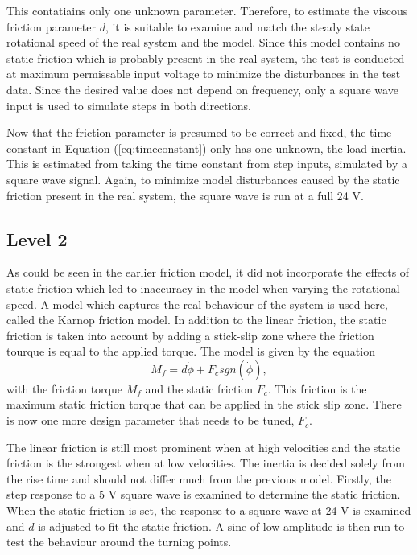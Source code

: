 \documentclass[12pt,a4paper]{article}
\begin{document}
This contatiains only one unknown parameter. Therefore, to estimate the viscous
friction parameter $d$, it is suitable to examine and match the steady state
rotational speed of the real system and the model. Since this model contains no
static friction which is probably present in the real system, the test is
conducted at maximum permissable input voltage to minimize the disturbances in
the test data. Since the desired value does not depend on frequency, only a
square wave input is used to simulate steps in both directions. \par
Now that the friction parameter is presumed to be correct and fixed, the time
constant in Equation (\ref{eq:timeconstant}) only has one unknown, the load
inertia. This is estimated from taking the time constant from step inputs,
simulated by a square wave signal. Again, to minimize model disturbances caused
by the static friction present in the real system, the square wave is run at a
full 24 V. 
\subsection*{Level 2}
\label{sub:level_2}
As could be seen in the earlier friction model, it did not incorporate the
effects of static friction which led to inaccuracy in the model when varying the
rotational speed. A model which captures the real behaviour of the system is
used here, called the Karnop friction model. In addition to the linear friction,
the static friction is taken into account by adding a stick-slip zone where the
friction tourque is equal to the applied torque. The model is given by the
equation
\begin{equation}
    \label{eq:karnop}
    M_f = d \dot{\phi} + F_c sgn(\dot{\phi}),
\end{equation}
with the friction torque $M_f$ and the static friction $F_c$. This friction is
the maximum static friction torque that can be applied in the stick slip zone.
There is now one more design parameter that needs to be tuned, $F_c$.
\par
The linear friction is still most prominent when at high velocities and the
static friction is the strongest when at low velocities. The inertia is decided
solely from the rise time and should not differ much from the previous model.
Firstly, the step response to a 5 V square wave is examined to determine the
static friction. When the static friction is set, the response to a square wave
at 24 V is examined and $d$ is adjusted to fit the static friction. A sine of
low amplitude is then run to test the behaviour around the turning points.
\end{document}
